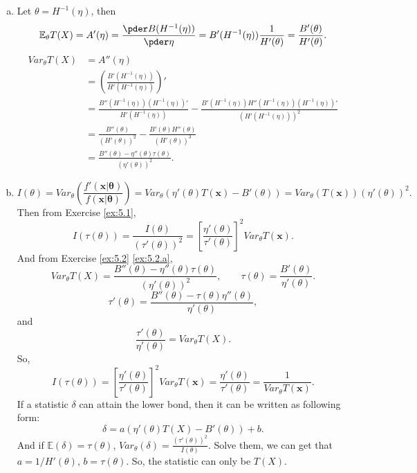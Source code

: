 \begin{solution}
    \begin{enumerate}[(a)]
        \item \label{ex:5.2.a} Let $\theta=H^{-1}(\eta)$, then 
        \[
            \mathbb{E}_\theta T(X) = A'(\eta) =\frac{\pder B(H^{-1}(\eta))}{\pder \eta}=B'(H^{-1}(\eta))\frac{1}{H'(\theta)}=\frac{B'(\theta)}{H'(\theta)}. 
        \]
        \[
            \begin{aligned}
                Var_\theta T(X)&=A''(\eta)\\
                &=\left(\frac{B'(H^{-1}(\eta))}{H'(H^{-1}(\eta))}\right)'\\
                &=\frac{B''(H^{-1}(\eta))(H^{-1}(\eta))'}{H'(H^{-1}(\eta))}-\frac{B'(H^{-1}(\eta))H''(H^{-1}(\eta))(H^{-1}(\eta))'}{\left(H'(H^{-1}(\eta))\right)^2}\\
                &=\frac{B''(\theta)}{(H'(\theta))^2}-\frac{B'(\theta)H''(\theta)}{(H'(\theta))^3}\\
                &=\frac{B''(\theta)-\eta''(\theta)\tau(\theta)}{(\eta'(\theta))^2}. 
            \end{aligned}
        \]
        \item \[
            I(\theta)=Var_\theta\left(\frac{f'(\mathbf{x|\theta})}{f(\mathbf{x|\theta})}\right)=Var_{\theta}(\eta'(\theta)T(\mathbf{x})-B'(\theta))=Var_\theta(T(\mathbf{x}))(\eta'(\theta))^2. 
        \]
        Then from Exercise \ref{ex:5.1}, 
        \begin{equation}
            I(\tau(\theta))=\frac{I(\theta)}{(\tau'(\theta))^2}=\left[\frac{\eta'(\theta)}{\tau'(\theta)}\right]^2Var_\theta T(\mathbf{x}). 
            \label{eq:5.2.1}
        \end{equation}
        And from Exercise \ref{ex:5.2} \ref{ex:5.2.a},
        \[
            Var_\theta T(X)=\frac{B''(\theta)-\eta''(\theta)\tau(\theta)}{(\eta'(\theta))^2}, \qquad \tau(\theta)=\frac{B'(\theta)}{\eta'(\theta)}. 
        \]
        \[
            \tau'(\theta)=\frac{B''(\theta)-\tau(\theta)\eta''(\theta)}{\eta'(\theta)}, 
        \]
        and \[
            \frac{\tau'(\theta)}{\eta'(\theta)}=Var_\theta T(X).
        \]
        So, 
        \[
            I(\tau(\theta))=\left[\frac{\eta'(\theta)}{\tau'(\theta)}\right]^2Var_\theta T(\mathbf{x})=\frac{\eta'(\theta)}{\tau'(\theta)}=\frac{1}{Var_\theta T(\mathbf{x})}. 
        \]
        If a statistic $\delta$ can attain the lower bond, then it can be written as following form: 
        \[
           \delta=a\left(\eta'(\theta)T(X)-B'(\theta)\right)+b.
        \]
        And if $\mathbb{E}(\delta)=\tau(\theta)$, $Var_\theta(\delta)=\frac{(\tau'(\theta))^2}{I(\theta)}$. Solve them, we can get that $a=1/H'(\theta)$, $b=\tau(\theta)$. So, the statistic can only be $T(X)$. 
    \end{enumerate}
\end{solution}

